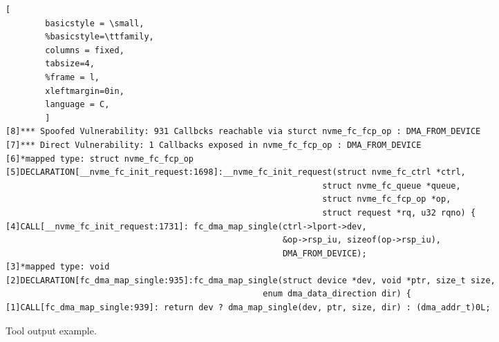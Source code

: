 \begin{figure*}[t]
\begin{adjustbox}{width=\linewidth}
        \begin{lstlisting}[
        basicstyle = \small,
        %basicstyle=\ttfamily,
        columns = fixed,
        tabsize=4,
        %frame = l,
        xleftmargin=0in,
        language = C,
        ]
[8]*** Spoofed Vulnerability: 931 Callbcks reachable via sturct nvme_fc_fcp_op : DMA_FROM_DEVICE
[7]*** Direct Vulnerability: 1 Callbacks exposed in nvme_fc_fcp_op : DMA_FROM_DEVICE
[6]*mapped type: struct nvme_fc_fcp_op
[5]DECLARATION[__nvme_fc_init_request:1698]:__nvme_fc_init_request(struct nvme_fc_ctrl *ctrl,
                                                                struct nvme_fc_queue *queue, 
                                                                struct nvme_fc_fcp_op *op, 
                                                                struct request *rq, u32 rqno) {
[4]CALL[__nvme_fc_init_request:1731]: fc_dma_map_single(ctrl->lport->dev,
                                                        &op->rsp_iu, sizeof(op->rsp_iu),
                                                        DMA_FROM_DEVICE);
[3]*mapped type: void
[2]DECLARATION[fc_dma_map_single:935]:fc_dma_map_single(struct device *dev, void *ptr, size_t size, 
                                                    enum dma_data_direction dir) {
[1]CALL[fc_dma_map_single:939]: return dev ? dma_map_single(dev, ptr, size, dir) : (dma_addr_t)0L;

                \end{lstlisting}
\end{adjustbox}
        \caption{ Tool output example.}
        \label{fig:tool_example}

\end{figure*}
